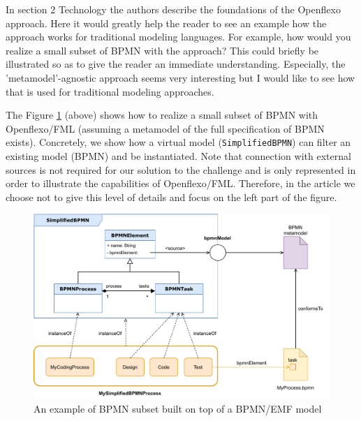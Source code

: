\documentclass[10pt]{article}
\begin{document}
\begin{response}{In section 2 Technology the authors describe the foundations of the Openflexo approach. Here it would greatly help the reader to see an example how the approach works for traditional modeling languages. For example, how would you realize a small subset of BPMN with the approach? This could briefly be illustrated so as to give the reader an immediate understanding. Especially, the 'metamodel'-agnostic approach seems very interesting but I would like to see how that is used for traditional modeling approaches.}

The Figure \ref{fig:BPMNSubsetExample} (above) shows how to realize a small subset of BPMN with Openflexo/FML (assuming a metamodel of the full specification of BPMN exists). Concretely, we show  how a virtual model (\texttt{SimplifiedBPMN}) can filter an existing model (BPMN) and be instantiated. Note that connection with external sources is not required for our solution to the challenge and is only represented in order to illustrate the capabilities of Openflexo/FML. Therefore, in the article we choose not to give this level of details and focus on the left part of the figure.


\begin{figure}[t]
    \centering
    \includegraphics[width=1.0 \textwidth]{Figures/BPMNSubsetExampleWithExternalConnexion.pdf}
    \caption{An example of BPMN subset built on top of a BPMN/EMF model}
    \label{fig:BPMNSubsetExample}
\end{figure}


\end{response}
\end{document}
